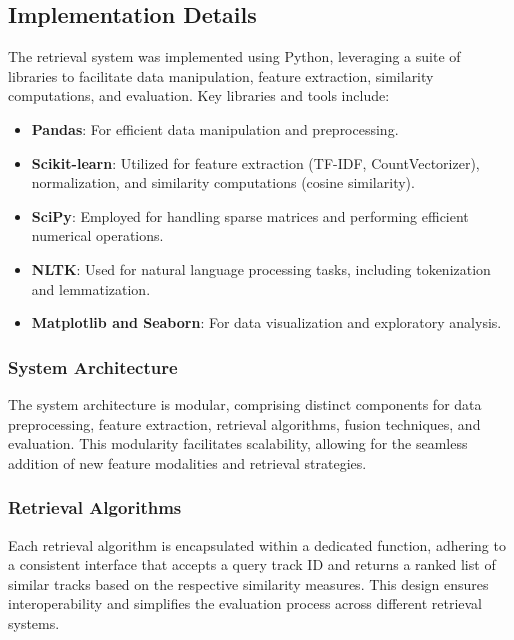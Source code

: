 \documentclass[sigconf]{acmart}
\begin{document}
\subsection{Implementation Details}
\label{subsec:implementation_details}

The retrieval system was implemented using Python, leveraging a suite of libraries to facilitate data manipulation, feature extraction, similarity computations, and evaluation. Key libraries and tools include:

\begin{itemize}
    \item \textbf{Pandas}: For efficient data manipulation and preprocessing.
    \item \textbf{Scikit-learn}: Utilized for feature extraction (TF-IDF, CountVectorizer), normalization, and similarity computations (cosine similarity).
    \item \textbf{SciPy}: Employed for handling sparse matrices and performing efficient numerical operations.
    \item \textbf{NLTK}: Used for natural language processing tasks, including tokenization and lemmatization.
    \item \textbf{Matplotlib and Seaborn}: For data visualization and exploratory analysis.
\end{itemize}

\subsubsection{System Architecture}

The system architecture is modular, comprising distinct components for data preprocessing, feature extraction, retrieval algorithms, fusion techniques, and evaluation. This modularity facilitates scalability, allowing for the seamless addition of new feature modalities and retrieval strategies.

\subsubsection{Retrieval Algorithms}

Each retrieval algorithm is encapsulated within a dedicated function, adhering to a consistent interface that accepts a query track ID and returns a ranked list of similar tracks based on the respective similarity measures. This design ensures interoperability and simplifies the evaluation process across different retrieval systems.
\end{document}
